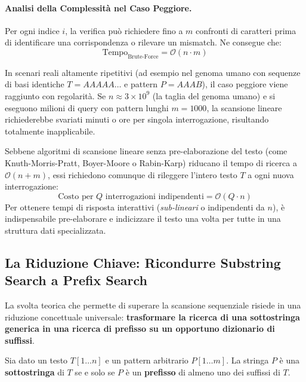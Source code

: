 \paragraph{Analisi della Complessit\`a nel Caso Peggiore.}
Per ogni indice $i$, la verifica pu\`o richiedere fino a $m$ confronti di caratteri prima di identificare una corrispondenza o rilevare un mismatch. Ne consegue che:
\begin{equation}
  \text{Tempo}_{\text{Brute-Force}} = \mathcal{O}(n \cdot m)
\end{equation}

In scenari reali altamente ripetitivi (ad esempio nel genoma umano con sequenze di basi identiche $T = AAAAA\dots$ e pattern $P = AAAB$), il caso peggiore viene raggiunto con regolarit\`a. Se $n \approx 3 \times 10^9$ (la taglia del genoma umano) e si eseguono milioni di query con pattern lunghi $m = 1000$, la scansione lineare richiederebbe svariati minuti o ore per singola interrogazione, risultando totalmente inapplicabile.

Sebbene algoritmi di scansione lineare senza pre-elaborazione del testo (come Knuth-Morris-Pratt, Boyer-Moore o Rabin-Karp) riducano il tempo di ricerca a $\mathcal{O}(n + m)$, essi richiedono comunque di rileggere l'intero testo $T$ a ogni nuova interrogazione:
\begin{equation}
  \text{Costo per $Q$ interrogazioni indipendenti} = \mathcal{O}(Q \cdot n)
\end{equation}
Per ottenere tempi di risposta interattivi (\textit{sub-lineari} o indipendenti da $n$), \`e indispensabile pre-elaborare e indicizzare il testo una volta per tutte in una struttura dati specializzata.

\FloatBarrier
\subsection{La Riduzione Chiave: Ricondurre Substring Search a Prefix Search}
\label{subsec:teorema-riduzione-suffissi}

La svolta teorica che permette di superare la scansione sequenziale risiede in una riduzione concettuale universale: \textbf{trasformare la ricerca di una sottostringa generica in una ricerca di prefisso su un opportuno dizionario di suffissi}.

\begin{theorem}
\label{thm:riduzione-suffissi}
Sia dato un testo $T[1 \dots n]$ e un pattern arbitrario $P[1 \dots m]$. La stringa $P$ \`e una \textbf{sottostringa} di $T$ se e solo se $P$ \`e un \textbf{prefisso} di almeno uno dei suffissi di $T$.
\end{theorem}

